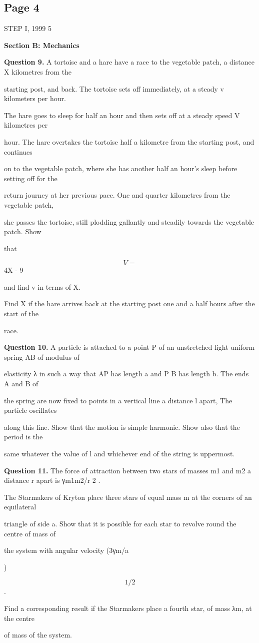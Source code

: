 \documentclass[12pt]{article}
\begin{document}
\subsection*{Page 4}
\begin{flushleft}
STEP I, 1999 5\par
\bigskip\textbf{Section B: Mechanics}\par
\bigskip\textbf{Question 9.} A tortoise and a hare have a race to the vegetable patch, a distance X kilometres from the\par
starting post, and back. The tortoise sets off immediately, at a steady v kilometers per hour.\par
The hare goes to sleep for half an hour and then sets off at a steady speed V kilometres per\par
hour. The hare overtakes the tortoise half a kilometre from the starting post, and continues\par
on to the vegetable patch, where she has another half an hour's sleep before setting off for the\par
return journey at her previous pace. One and quarter kilometres from the vegetable patch,\par
she passes the tortoise, still plodding gallantly and steadily towards the vegetable patch. Show\par
that\par
\[V =\]
4X - 9\par
and find v in terms of X.\par
Find X if the hare arrives back at the starting post one and a half hours after the start of the\par
race.\par
\bigskip\textbf{Question 10.} A particle is attached to a point P of an unstretched light uniform spring AB of modulus of\par
elasticity λ in such a way that AP has length a and P B has length b. The ends A and B of\par
the spring are now fixed to points in a vertical line a distance l apart, The particle oscillates\par
along this line. Show that the motion is simple harmonic. Show also that the period is the\par
same whatever the value of l and whichever end of the string is uppermost.\par
\bigskip\textbf{Question 11.} The force of attraction between two stars of masses m1 and m2 a distance r apart is γm1m2/r 2 .\par
The Starmakers of Kryton place three stars of equal mass m at the corners of an equilateral\par
triangle of side a. Show that it is possible for each star to revolve round the centre of mass of\par
the system with angular velocity (3γm/a\par
)\par
\[1/2\]
.\par
Find a corresponding result if the Starmakers place a fourth star, of mass λm, at the centre\par
of mass of the system.\par
\end{flushleft}
\end{document}
